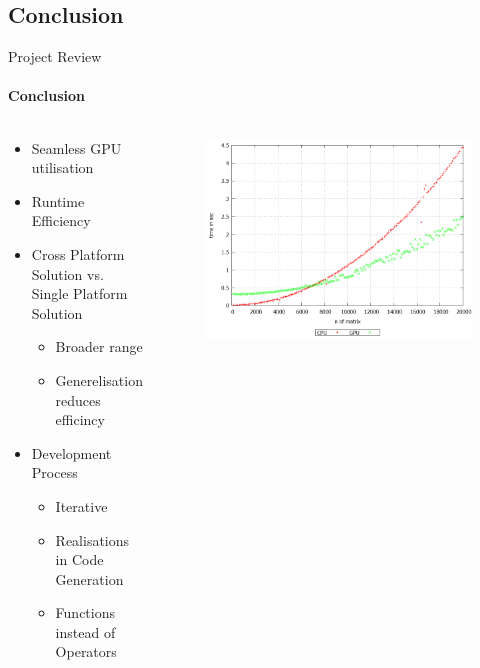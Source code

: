 	\subsection{Conclusion}
	\begin{frame}[t]{Project Review}\framesubtitle{Conclusion}
	\begin{columns}[T]
	\begin{column}{0.48\textwidth}
		\begin{itemize}
			\item Seamless GPU utilisation
			\item Runtime Efficiency
			\item Cross Platform Solution vs. Single Platform Solution
			\begin{itemize}
				\item Broader range
				\item Generelisation reduces efficincy
			\end{itemize}
			\item Development Process
			\begin{itemize}
				\item Iterative
				\item Realisations in Code Generation
				\item Functions instead of Operators
			\end{itemize}
		\end{itemize}
	\end{column}
	\begin{column}{.48\textwidth}
      \begin{figure}
         \includegraphics[width=1\textwidth]{images/benchmark.png}

\end{figure}
\end{column}
\end{columns}
\end{frame}
